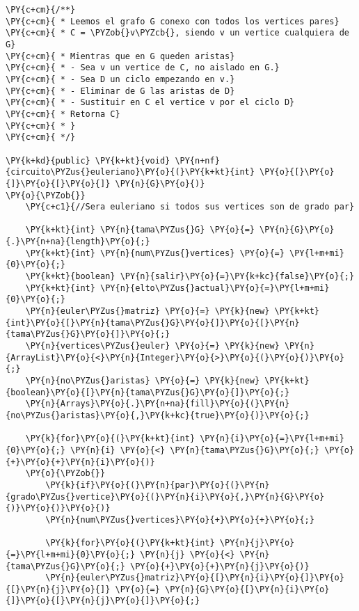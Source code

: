 \begin{Verbatim}[commandchars=\\\{\}]
\PY{c+cm}{/**}
\PY{c+cm}{ * Leemos el grafo G conexo con todos los vertices pares}
\PY{c+cm}{ * C = \PYZob{}v\PYZcb{}, siendo v un vertice cualquiera de G}
\PY{c+cm}{ * Mientras que en G queden aristas}
\PY{c+cm}{ * - Sea v un vertice de C, no aislado en G.}
\PY{c+cm}{ * - Sea D un ciclo empezando en v.}
\PY{c+cm}{ * - Eliminar de G las aristas de D}
\PY{c+cm}{ * - Sustituir en C el vertice v por el ciclo D}
\PY{c+cm}{ * Retorna C}
\PY{c+cm}{ * }
\PY{c+cm}{ */}
    
\PY{k+kd}{public} \PY{k+kt}{void} \PY{n+nf}{circuito\PYZus{}euleriano}\PY{o}{(}\PY{k+kt}{int} \PY{o}{[}\PY{o}{]}\PY{o}{[}\PY{o}{]} \PY{n}{G}\PY{o}{)}
\PY{o}{\PYZob{}}
    \PY{c+c1}{//Sera euleriano si todos sus vertices son de grado par}
	
    \PY{k+kt}{int} \PY{n}{tama\PYZus{}G} \PY{o}{=} \PY{n}{G}\PY{o}{.}\PY{n+na}{length}\PY{o}{;}
    \PY{k+kt}{int} \PY{n}{num\PYZus{}vertices} \PY{o}{=} \PY{l+m+mi}{0}\PY{o}{;}
    \PY{k+kt}{boolean} \PY{n}{salir}\PY{o}{=}\PY{k+kc}{false}\PY{o}{;}
    \PY{k+kt}{int} \PY{n}{elto\PYZus{}actual}\PY{o}{=}\PY{l+m+mi}{0}\PY{o}{;}
    \PY{n}{euler\PYZus{}matriz} \PY{o}{=} \PY{k}{new} \PY{k+kt}{int}\PY{o}{[}\PY{n}{tama\PYZus{}G}\PY{o}{]}\PY{o}{[}\PY{n}{tama\PYZus{}G}\PY{o}{]}\PY{o}{;}
    \PY{n}{vertices\PYZus{}euler} \PY{o}{=} \PY{k}{new} \PY{n}{ArrayList}\PY{o}{<}\PY{n}{Integer}\PY{o}{>}\PY{o}{(}\PY{o}{)}\PY{o}{;}
    \PY{n}{no\PYZus{}aristas} \PY{o}{=} \PY{k}{new} \PY{k+kt}{boolean}\PY{o}{[}\PY{n}{tama\PYZus{}G}\PY{o}{]}\PY{o}{;}
    \PY{n}{Arrays}\PY{o}{.}\PY{n+na}{fill}\PY{o}{(}\PY{n}{no\PYZus{}aristas}\PY{o}{,}\PY{k+kc}{true}\PY{o}{)}\PY{o}{;}
	
    \PY{k}{for}\PY{o}{(}\PY{k+kt}{int} \PY{n}{i}\PY{o}{=}\PY{l+m+mi}{0}\PY{o}{;} \PY{n}{i} \PY{o}{<} \PY{n}{tama\PYZus{}G}\PY{o}{;} \PY{o}{+}\PY{o}{+}\PY{n}{i}\PY{o}{)}
	\PY{o}{\PYZob{}}
	    \PY{k}{if}\PY{o}{(}\PY{n}{par}\PY{o}{(}\PY{n}{grado\PYZus{}vertice}\PY{o}{(}\PY{n}{i}\PY{o}{,}\PY{n}{G}\PY{o}{)}\PY{o}{)}\PY{o}{)}
		\PY{n}{num\PYZus{}vertices}\PY{o}{+}\PY{o}{+}\PY{o}{;}

	    \PY{k}{for}\PY{o}{(}\PY{k+kt}{int} \PY{n}{j}\PY{o}{=}\PY{l+m+mi}{0}\PY{o}{;} \PY{n}{j} \PY{o}{<} \PY{n}{tama\PYZus{}G}\PY{o}{;} \PY{o}{+}\PY{o}{+}\PY{n}{j}\PY{o}{)}
		\PY{n}{euler\PYZus{}matriz}\PY{o}{[}\PY{n}{i}\PY{o}{]}\PY{o}{[}\PY{n}{j}\PY{o}{]} \PY{o}{=} \PY{n}{G}\PY{o}{[}\PY{n}{i}\PY{o}{]}\PY{o}{[}\PY{n}{j}\PY{o}{]}\PY{o}{;}
		    

\end{Verbatim}
